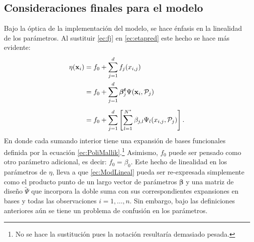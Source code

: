 \documentclass[../Main/Main.tex]{subfiles}
\begin{document}
\subsection{Consideraciones finales para el modelo}
Bajo la óptica de la implementación del modelo, se hace énfasis en la linealidad de los parámetros. Al sustituir \eqref{ec:fj} en \eqref{ec:etapred} este hecho se hace más evidente:
\begin{align}
	\eta(\mathbf{x}_i) &= f_0 + \sum_{j=1}^d f_j(x_{i,j}) \nonumber\\
			   &= f_0 + \sum_{j=1}^d \bm{\beta^t}_j\Psi(\mathbf{x}_i,\mathcal{P}_j) \nonumber\\[4pt]
	&= f_0 + \sum_{j=1}^d  \left[\sum_{l = 1}^{N^*} \beta_{j,l} \Psi_l(x_{i,j}, \mathcal{P}_j)\right]. \label{ec:ModLineal}
\end{align}
En donde cada sumando interior tiene una expansión de bases funcionales definida por la ecuación \eqref{ec:PoliMallik}.\footnote{No se hace la sustitución pues la notación resultaría demasiado pesada.} Asimismo, $f_0$ puede ser pensado como otro parámetro adicional, es decir: $f_0 = \beta_0$. Este hecho de linealidad en los parámetros de $\eta$, lleva a que \eqref{ec:ModLineal} pueda ser re-expresada simplemente como el producto punto de un largo vector de parámetros $\bm{\beta}$ y una matriz de diseño $\widetilde{\Psi}$ que incorpora la doble suma con sus correspondientes expansiones en bases y todas las observaciones $i = 1,\ldots,n$. Sin embargo, bajo las definiciones anteriores aún se tiene un problema de confusión en los parámetros. 
\end{document}
